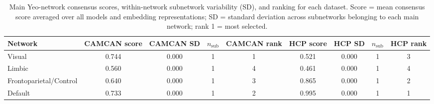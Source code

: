 \begin{table}[ht]
\caption{Main Yeo-network consensus scores, within-network subnetwork variability (SD), and ranking for each dataset. Score = mean consensus score averaged over all models and embedding representations; SD = standard deviation across subnetworks belonging to each main network; rank 1 = most selected.}
\label{tab:main_network_ranks}
\begin{tabular}{lcccccccc}
\toprule
Network & CAMCAN score & CAMCAN SD & $n_{\text{sub}}$ & CAMCAN rank & HCP score & HCP SD & $n_{\text{sub}}$ & HCP rank \\
\midrule
Visual & 0.744 & 0.000 & 1 & 1 & 0.521 & 0.000 & 1 & 3 \\
Limbic & 0.560 & 0.000 & 1 & 4 & 0.461 & 0.000 & 1 & 4 \\
Frontoparietal/Control & 0.640 & 0.000 & 1 & 3 & 0.865 & 0.000 & 1 & 2 \\
Default & 0.733 & 0.000 & 1 & 2 & 0.995 & 0.000 & 1 & 1 \\
\bottomrule
\end{tabular}
\end{table}
